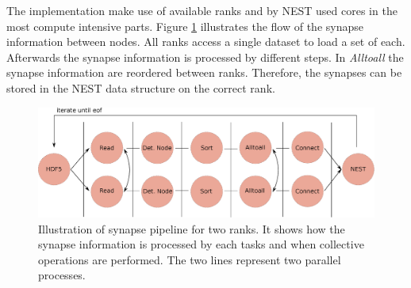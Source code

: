 The implementation make use of available ranks and by NEST used cores in the most compute intensive parts.
Figure \ref{fig:ConnectInsideIteration} illustrates the flow of the synapse information between nodes. 
All ranks access a single dataset to load a set of each. Afterwards the synapse information is processed by different steps.
In \emph{Alltoall} the synapse information are reordered between ranks.
Therefore, the synapses can be stored in the NEST data structure on the correct rank.
\begin{figure}[ht!]
\centering
\includegraphics[scale=0.4]{pictures/Connect_inside_iteration.eps}
\caption{Illustration of synapse pipeline for two ranks. It shows how the synapse information is processed by each tasks and when collective operations are performed.
The two lines represent two parallel processes.}
\label{fig:ConnectInsideIteration}
\end{figure}
\newpage
